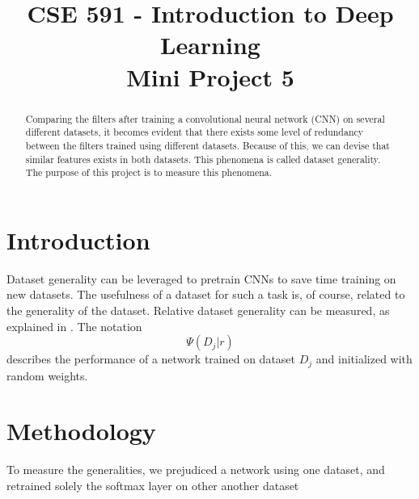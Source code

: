\documentclass[conference,compsoc]{IEEEtran}
\begin{document}
%
\title{CSE 591 - Introduction to Deep Learning\\Mini Project 5}


\author{
}

\maketitle

\begin{abstract}
Comparing the filters after training a convolutional neural network (CNN) on several different datasets, it becomes evident that there exists some level of redundancy between the filters trained using different datasets. Because of this, we can devise that similar features exists in both datasets. This phenomena is called dataset generality. The purpose of this project is to measure this phenomena. 
\end{abstract}



\IEEEpeerreviewmaketitle



\section{Introduction}
Dataset generality can be leveraged to pretrain CNNs to save time training on new datasets. The usefulness of a dataset for such a task is, of course, related to the generality of the dataset. Relative dataset generality can be measured, as explained in \cite{DBLP:journals/corr/VenkatesanGL16}. The notation 
\begin{equation}
\Psi(D_j|r)
\end{equation}
describes the performance of a network trained on dataset $D_j$ and initialized with random weights. 


 


\section{Methodology}
To measure the generalities, we prejudiced a network using one dataset, and retrained solely the softmax layer on other another dataset
\end{document}
